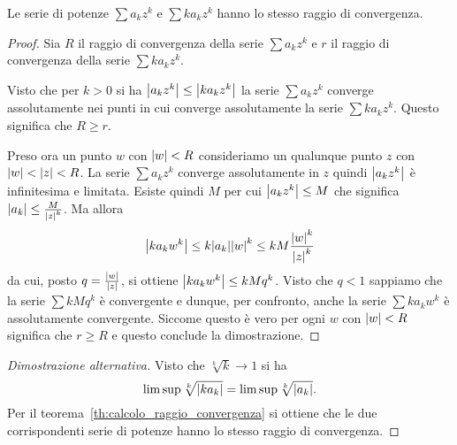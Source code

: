 \begin{theorem}
\label{th:raggio_serie_derivate}
Le serie di potenze $\sum a_k z^k$ e $\sum k a_k z^k$ hanno
lo stesso raggio di convergenza.
\end{theorem}
%
\begin{proof}
  Sia $R$ il raggio di convergenza della serie $\sum a_k z^k$ 
  e $r$ il raggio di convergenza della serie $\sum k a_k z^k$.
  
  Visto che per $k>0$ si ha ${\left|a_k z^k\right|} \le {\left|k a_k z^k\right|}$
  la serie $\sum a_k z^k$ converge assolutamente nei punti 
  in cui converge assolutamente la serie $\sum k a_k z^k$.
  Questo significa che $R\ge r$.

  Preso ora un punto $w$ con ${\left|w\right|}<R$ consideriamo un
  qualunque punto $z$ con ${\left|w\right|}<{\left|z\right|}<R$.
  La serie $\sum a_k z^k$ converge assolutamente in $z$ 
  quindi ${\left|a_k z^k\right|}$ è infinitesima e limitata.
  Esiste quindi $M$ per cui ${\left|a_k z^k\right|}\le M$ 
  che significa ${\left|a_k\right|} \le \frac{M}{{\left|z\right|}^k}$.
  Ma allora 
  \[
    {\left|k a_k w^k\right|} 
    \le k {\left|a_k\right|} {\left|w\right|}^k
    \le k M \frac{{\left|w\right|}^k}{{\left|z\right|}^k}
  \]
  da cui, posto $q=\frac{{\left|w\right|}}{{\left|z\right|}}$, si ottiene 
  ${\left|k a_k w^k\right|} \le k M q^k$. 
  Visto che $q<1$ sappiamo che la serie $\sum k M q^k$ 
  è convergente e dunque, per confronto, anche la 
  serie $\sum k a_k w^k$ è assolutamente convergente.
  Siccome questo è vero per ogni $w$ con ${\left|w\right|}<R$
  significa che $r\ge R$ e questo conclude la dimostrazione.
\end{proof}
%
\begin{proof}[Dimostrazione alternativa]
Visto che $\sqrt[k]{k}\to 1$ si ha
\[
  \limsup \sqrt[k]{{\left|k a_k\right|}} = \limsup \sqrt[k]{{\left|a_k\right|}}.
\]
Per il teorema~\ref{th:calcolo_raggio_convergenza} si ottiene
che le due corrispondenti serie di potenze hanno lo stesso raggio di convergenza.
\end{proof}

